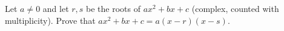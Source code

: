 Let $a\ne0$ and let $r,s$ be the roots of $ax^2+bx+c$ (complex, counted with multiplicity). Prove that $ax^2+bx+c=a(x-r)(x-s)$.
